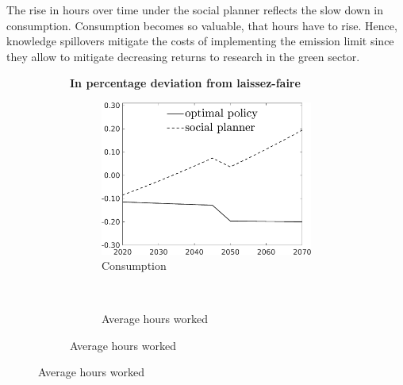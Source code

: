 The rise in hours over time under the social planner reflects the slow down in consumption. Consumption becomes so valuable, that hours have to rise. 
Hence, knowledge spillovers mitigate the costs of implementing the emission limit since they allow to mitigate decreasing returns to research in the green sector. 

\begin{figure}[h!!!]
	\centering 	\caption{Efficient and optimal allocation: no knowledge spillovers}\label{fig:optAll_percLf_dyn_noKN}
		\begin{subfigure}[]{1\textwidth}	
		\centering\footnotesize{\textbf{In percentage deviation from laissez-faire}}\\ \vspace{2mm}
		\begin{subfigure}[]{0.4\textwidth}
			\caption{Consumption}
			\includegraphics[width=1\textwidth]{../../codding_model/own_basedOnFried/optimalPol_010922_revision/figures/all_13Sept22_Tplus30/C_PercentageLFDyn_Target_regime4_knspil1_spillover0_noskill0_sep0_xgrowth0_PV1_etaa0.79_lgd1.png}
		\end{subfigure}
		\begin{minipage}[]{0.1\textwidth}
			\ 
		\end{minipage}
		\begin{subfigure}[]{0.4\textwidth}
			\caption{Average hours worked }

\end{subfigure}
\end{subfigure}
\end{figure}
